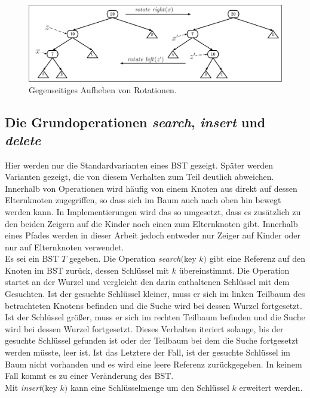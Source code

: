 \documentclass[a4paper,12pt]{article}
\begin{document}
\begin{figure}[H]
	\centering
	\includegraphics[width= 1\textwidth]{Medien/Einleitung/LinksRechtsRotation}
	\caption{Gegenseitiges Aufheben von Rotationen.}
	\label{fig:LinksRechtsRotation}
\end{figure}

\subsection{Die Grundoperationen \textit{search}, \textit{insert} und \textit{delete}} \label{BST Operationen}
Hier werden nur die Standardvarianten eines BST gezeigt. Später werden Varianten gezeigt, die von diesem Verhalten zum Teil deutlich abweichen. Innerhalb von Operationen wird häufig von einem Knoten aus direkt
auf dessen Elternknoten zugegriffen, so dass sich im Baum auch nach oben hin bewegt werden kann. In Implementierungen wird das so umgesetzt, dass es zusätzlich zu den beiden Zeigern auf die Kinder noch einen zum Elternknoten gibt. Innerhalb eines Pfades werden in dieser Arbeit jedoch entweder nur Zeiger auf Kinder oder nur auf Elternknoten verwendet.\\
 Es sei ein BST $T$ gegeben. Die Operation \textit{search}$($key $k)$ gibt eine Referenz auf den Knoten im BST zurück, dessen Schlüssel mit $k$ übereinstimmt. Die Operation startet an der Wurzel und vergleicht den darin enthaltenen Schlüssel mit dem Gesuchten. Ist der gesuchte Schlüssel kleiner, muss er sich im linken Teilbaum des betrachteten Knotens befinden und die Suche wird bei dessen Wurzel fortgesetzt. Ist der Schlüssel größer, muss er sich im rechten Teilbaum befinden und die Suche wird bei dessen Wurzel fortgesetzt. Dieses Verhalten iteriert solange, bis der gesuchte Schlüssel gefunden ist oder der Teilbaum bei dem die Suche fortgesetzt werden müsste, leer ist. Ist das Letztere der Fall, ist der gesuchte Schlüssel im Baum nicht vorhanden und es wird eine leere Referenz zurückgegeben. In keinem Fall kommt es zu einer Veränderung des BST.\\
Mit \textit{insert}$($key $k)$  kann eine Schlüsselmenge um den Schlüssel $k$ erweitert werden. 
\end{document}
